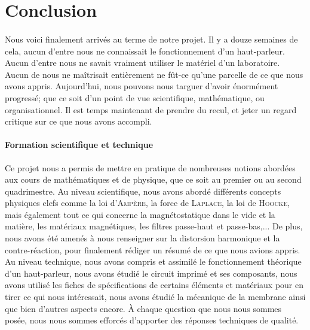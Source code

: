 


\section {Conclusion}

\paragraph{} Nous voici finalement arrivés au terme de notre projet. Il y a douze semaines de cela, aucun 
d'entre nous ne connaissait le fonctionnement d'un haut-parleur. Aucun d'entre nous ne savait vraiment utiliser 
le matériel d'un laboratoire. Aucun de nous ne maîtrisait entièrement ne fût-ce qu'une parcelle de ce que nous 
avons appris. Aujourd'hui, nous pouvons nous targuer d'avoir énormément progressé; que ce soit d'un point de
vue scientifique, mathématique, ou organisationnel. Il est temps maintenant de prendre du recul, et jeter un 
regard critique sur ce que nous avons accompli.

\paragraph{Formation scientifique et technique}
Ce projet nous a permis de mettre en pratique de nombreuses notions abordées aux cours de mathématiques et
de physique, que ce soit au premier ou au second quadrimestre. 
Au niveau scientifique, nous avons abordé différents concepts physiques clefs comme la loi d'\textsc{Ampère},
la force de \textsc{Laplace}, la loi de \textsc{Hoocke}, mais également tout ce qui concerne la 
magnétostatique dans le vide et la matière, les matériaux magnétiques, les filtres passe-haut et passe-bas,...
De plus, nous avons été amenés à nous renseigner sur la distorsion harmonique et la contre-réaction, pour 
finalement rédiger un résumé de ce que nous avions appris.
Au niveau technique, nous avons compris et assimilé le fonctionnement théorique d’un haut-parleur, nous avons
étudié le circuit imprimé et ses composants, nous avons utilisé les fiches de spécifications de certains 
éléments et matériaux pour en tirer ce qui nous intéressait, nous avons étudié la mécanique de la membrane
ainsi que bien d'autres aspects encore.
À chaque question que nous nous sommes posée, nous nous sommes efforcés d'apporter des réponses techniques 
de qualité.

